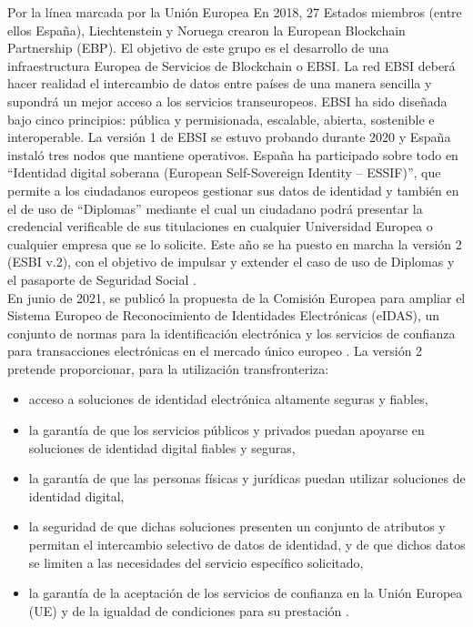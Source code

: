Por la línea marcada por la Unión Europea En 2018, 27 Estados miembros (entre ellos España), Liechtenstein y Noruega crearon la European Blockchain Partnership (EBP). El objetivo de este grupo es el desarrollo de una infraestructura Europea de Servicios de Blockchain o EBSI. La red EBSI deberá hacer realidad el intercambio de datos entre países de una manera sencilla y supondrá un mejor acceso a los servicios transeuropeos. EBSI ha sido diseñada bajo cinco principios: pública y permisionada, escalable, abierta, sostenible e interoperable. La versión 1 de EBSI se estuvo probando durante 2020 y España instaló tres nodos que mantiene operativos. España ha participado sobre todo en “Identidad digital soberana (European Self-Sovereign Identity – ESSIF)”, que permite a los ciudadanos europeos gestionar sus datos de identidad y también en el de uso de “Diplomas” mediante el cual un ciudadano podrá presentar la credencial verificable de sus titulaciones en cualquier Universidad Europea o cualquier empresa que se lo solicite. Este año se ha puesto en marcha la versión 2 (ESBI v.2), con el objetivo de impulsar y extender el caso de uso de Diplomas y el pasaporte de Seguridad Social \cite{web:EBSI}.\\
En junio de 2021, se publicó la propuesta de la Comisión Europea para ampliar el Sistema Europeo de Reconocimiento de Identidades Electrónicas (eIDAS), un conjunto de normas para la identificación electrónica y los servicios de confianza para transacciones electrónicas en el mercado único europeo \cite{web:eIDAS}. La versión 2 pretende proporcionar, para la utilización transfronteriza:
\begin{itemize}
    \item acceso a soluciones de identidad electrónica altamente seguras y fiables,
    \item la garantía de que los servicios públicos y privados puedan apoyarse en soluciones de identidad digital fiables y seguras,
    \item la garantía de que las personas físicas y jurídicas puedan utilizar soluciones de identidad digital,
    \item la seguridad de que dichas soluciones presenten un conjunto de atributos y permitan el intercambio selectivo de datos de identidad, y de que dichos datos se limiten a las necesidades del servicio específico solicitado,
    \item la garantía de la aceptación de los servicios de confianza en la Unión Europea (UE) y de la igualdad de condiciones para su prestación \cite{web:CE}.
\end{itemize}
\newpage
\thispagestyle{empty}